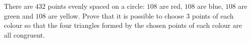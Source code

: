 There are $432$ points evenly spaced on a circle: $108$ are red, $108$ are blue, $108$ are green and $108$ are yellow. Prove that it is possible to choose $3$ points of each colour so that the four triangles formed by the chosen points of each colour are all congruent.
